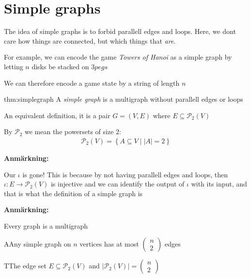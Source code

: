 \section{Simple graphs}\par
\noindent The idea of simple graphs is to forbid parallell edges and loops. Here, we dont care how things are connected, but which things that \textit{are}.
\par\bigskip
\noindent For example, we can encode the game \textit{Towers of Hanoi} as a simple graph by letting $n$ disks be stacked on $3 pegs$ \par
\noindent We can therefore encode a game state by a string of length $n$
\par\bigskip
\begin{theo}{thm:simplegraph}
  A \textit{simple graph} is a multigraph  without parallell edges or loops\par
  \noindent An equivalent definition, it is a pair $G = (V,E)$ where $E\subseteq\mathcal{P}_2(V)$
  \par\bigskip
  \noindent By $\mathcal{P}_2$ we mean the powersets of size 2:
  \begin{equation*}
    \begin{gathered}
    \mathcal{P}_2(V) = \left\{A\subseteq V\;|\; \left|A\right|=2\right\}
    \end{gathered}
  \end{equation*}
  \par\bigskip
  \noindent\textbf{Anmärkning:}\par
  \noindent Our $\iota$ is gone! This is because by not having parallell edges and loops, then $\iota:E\to\mathcal{P}_2(V)$ is injective and we can identify the output of $\iota$ with its input, and that is what the definition of a simple graph is 
\end{theo}
\par\bigskip
\noindent\textbf{Anmärkning:}\par
\noindent Every graph is a multigraph
\par\bigskip
\begin{lem}
  AAny simple graph on $n$ vertices has at most $\begin{pmatrix}n\\2\end{pmatrix}$ edges
\end{lem}
\par\bigskip
\begin{prf}
  TThe edge set $E\subseteq\mathcal{P}_2(V)$ and $\left|\mathcal{P}_2(V)\right|=\begin{pmatrix}n\\2\end{pmatrix}$
\end{prf}
